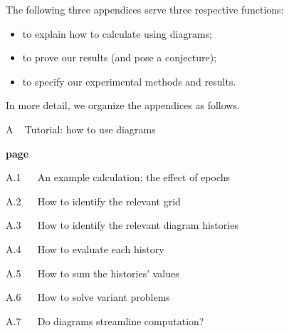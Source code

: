         The following three appendices serve three respective functions:
        \begin{itemize}[noitemsep]
            \item to explain how to calculate using diagrams;
            \item to prove our results (and pose a conjecture);
            \item to specify our experimental methods and results.
        \end{itemize}
        In more detail, we organize the appendices as follows.\\
    
        {\bf
        \par\noindent A ~ Tutorial: how to use diagrams}                        \hfill {\bf page \pageref{appendix:tutorial}}
        \par\indent     A.1 ~~ An example calculation: the effect of epochs     \hfill \pageref{appendix:example}
        \par\indent     A.2 ~~ How to identify the relevant grid                \hfill \pageref{appendix:draw-spacetime} 
        \par\indent     A.3 ~~ How to identify the relevant diagram histories  \hfill \pageref{appendix:draw-histories}
        \par\indent     A.4 ~~ How to evaluate each history                   \hfill \pageref{appendix:evaluate-histories}
        \par\indent     A.5 ~~ How to sum the histories' values                \hfill \pageref{appendix:sum-histories}
        \par\indent     A.6 ~~ How to solve variant problems                    \hfill \pageref{appendix:solve-variants}
        \par\indent     A.7 ~~ Do diagrams streamline computation?              \hfill \pageref{appendix:diagrams-streamline}
    
